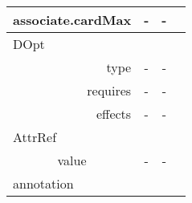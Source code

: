 \begin{table}[]
\begin{tabular}{|rccl|}
\multicolumn{1}{|r|}{associate.cardMax} & \multicolumn{1}{c|}{-}                                                                                             & \multicolumn{1}{c|}{-}                                                                                                 &                               \\ \hline
\multicolumn{4}{|l|}{\cellcolor[HTML]{DAE8FC}DOpt}                                                                                                                                                                                                                                                                    \\ \hline
\multicolumn{1}{|r|}{type}              & \multicolumn{1}{c|}{-}                                                                                             & \multicolumn{1}{c|}{-}                                                                                                 &                               \\ \hline
\multicolumn{1}{|r|}{requires}          & \multicolumn{1}{c|}{-}                                                                                             & \multicolumn{1}{c|}{-}                                                                                                 &                               \\ \hline
\multicolumn{1}{|r|}{effects}           & \multicolumn{1}{c|}{-}                                                                                             & \multicolumn{1}{c|}{-}                                                                                                 &                               \\ \hline
\multicolumn{4}{|l|}{\cellcolor[HTML]{DAE8FC}AttrRef}                                                                                                                                                                                                                                                                 \\ \hline
\multicolumn{1}{|c|}{value}             & \multicolumn{1}{c|}{-}                                                                                             & \multicolumn{1}{c|}{-}                                                                                                 &                               \\ \hline
\multicolumn{4}{|l|}{\cellcolor[HTML]{DAE8FC}annotation}                                                                                                                                                                                                                                                              \\ \hline

\end{tabular}
\end{table}
